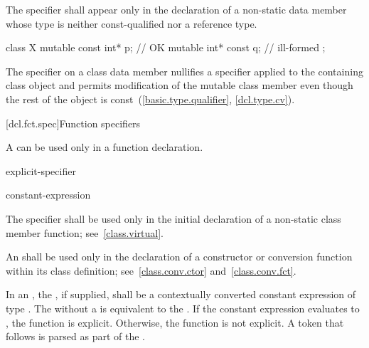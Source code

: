 \pnum
The  specifier shall appear only in the declaration of
a non-static data member
whose type is neither const-qualified nor a reference type.
\begin{example}
\begin{codeblock}
class X {
  mutable const int* p;         // OK
  mutable int* const q;         // ill-formed
};
\end{codeblock}
\end{example}

\pnum
\begin{note}
The  specifier on a class data member nullifies a
 specifier applied to the containing class object and
permits modification of the mutable class member even though the rest of
the object is const~(\ref{basic.type.qualifier}, \ref{dcl.type.cv}).
\end{note}

[dcl.fct.spec]{Function specifiers}%
%

\pnum
A
can be used only in a function declaration.

\begin{bnf}
\br
    \br
    explicit-specifier
\end{bnf}

\begin{bnf}
\br
     \terminal{(} constant-expression \terminal{)}\br
\end{bnf}

\pnum
{}%
The  specifier shall be used only in the initial
declaration of a non-static class member function;
see~\ref{class.virtual}.

\pnum
{}%
An  shall be used only in the declaration of
a constructor or conversion function within its class definition;
see~\ref{class.conv.ctor} and~\ref{class.conv.fct}.

\pnum
In an ,
the , if supplied, shall be a
contextually converted constant expression of type .
The  
without a  is equivalent to
the  .
If the constant expression evaluates to ,
the function is explicit. Otherwise, the function is not explicit.
A \tcode{(} token that follows  is parsed as
part of the .

